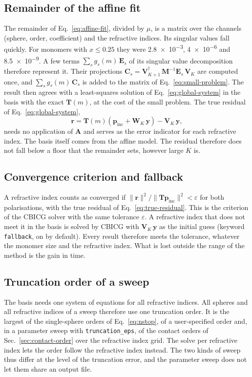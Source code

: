 \documentclass[11pt,a4paper]{article}
\begin{document}
\subsection{Remainder of the affine fit}
\label{sec:affine-remainder}
The remainder of Eq.~\eqref{eq:affine-fit}, divided by $\mu$, is a matrix over the channels (sphere, order, coefficient) and the refractive indices.
Its singular values fall quickly.
For monomers with $x \leq 0.25$ they were \num{2.8e-3}, \num{4e-6} and \num{8.5e-9}.
A few terms $\sum_s g_s(m)\,\mathbf{E}_s$ of its singular value decomposition therefore represent it.
Their projections $\mathbf{C}_s = \mathbf{V}_{K+1}^\dagger\,\mathbf{M}^{-1}\mathbf{E}_s\,\mathbf{V}_K$ are computed once, and $\sum_s g_s(m)\,\mathbf{C}_s$ is added to the matrix of Eq.~\eqref{eq:small-problem}.
The result then agrees with a least-squares solution of Eq.~\eqref{eq:global-system} in the basis with the exact $\mathbf{T}(m)$, at the cost of the small problem.
The true residual of Eq.~\eqref{eq:global-system},
\begin{equation}
  \bm{r} = \mathbf{T}(m)\left(\bm{p}_\mathrm{inc} + \mathbf{W}_K\,\bm{y}\right) - \mathbf{V}_K\,\bm{y},
  \label{eq:true-residual}
\end{equation}
needs no application of $\mathbf{A}$ and serves as the error indicator for each refractive index.
The basis itself comes from the affine model.
The residual therefore does not fall below a floor that the remainder sets, however large $K$ is.

\subsection{Convergence criterion and fallback}
\label{sec:shared-basis-fallback}
A refractive index counts as converged if $\|\bm{r}\|^2 / \|\mathbf{T}\bm{p}_\mathrm{inc}\|^2 < \varepsilon$ for both polarisations, with the true residual of Eq.~\eqref{eq:true-residual}.
This is the criterion of the CBICG solver with the same tolerance $\varepsilon$.
A refractive index that does not meet it in the basis is solved by CBICG with $\mathbf{V}_K\,\bm{y}$ as the initial guess (keyword \texttt{fallback}, on by default).
Every result therefore meets the tolerance, whatever the monomer size and the refractive index.
What is lost outside the range of the method is the gain in time.

\subsection{Truncation order of a sweep}
The basis needs one system of equations for all refractive indices.
All spheres and all refractive indices of a sweep therefore use one truncation order.
It is the largest of the single-sphere orders of Eq.~\eqref{eq:nstop}, of a user-specified order and, in a parameter sweep with \texttt{truncation\_eps}, of the contact orders of Sec.~\ref{sec:contact-order} over the refractive index grid.
The solve per refractive index lets the order follow the refractive index instead.
The two kinds of sweep thus differ at the level of the truncation error, and the parameter sweep does not let them share an output file.
\end{document}
